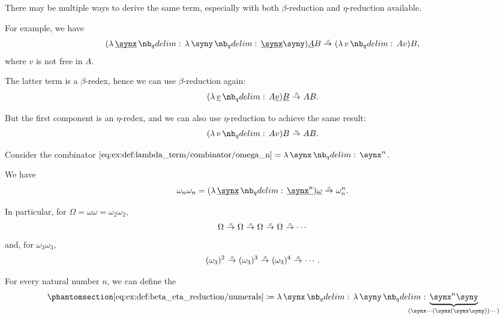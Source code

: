 \begin{example}
\begin{thmenum}
     There may be multiple ways to derive the same term, especially with both \( \beta \)-reduction and \( \eta \)-reduction available.

    For example, we have
    \begin{equation*}
      (\qabs {\hi{\synx}} \qabs \syny \hi{\synx} \syny) \hi{A} B \bred (\qabs v A v) B,
    \end{equation*}
    where \( v \) is not free in \( A \).

    The latter term is a \( \beta \)-redex, hence we can use \( \beta \)-reduction again:
    \begin{equation*}
      (\qabs {\hi{v}} A \hi{v}) \hi{B} \bred AB.
    \end{equation*}

    But the first component is an \( \eta \)-redex, and we can also use \( \eta \)-reduction to achieve the same result:
    \begin{equation*}
      (\qabs v A v) B \ered AB.
    \end{equation*}

     Consider the combinator \( \ref{eq:ex:def:lambda_term/combinator/omega_n} = \qabs \synx \synx^n \).

    We have
    \begin{equation*}
      \omega_n \omega_n
      =
      (\qabs {\hi{\synx}} \hi{\synx^n}) \hi{\omega}
      \bred
      \omega_n^n.
    \end{equation*}

    In particular, for \( \Omega = \omega \omega = \omega_2 \omega_2 \),
    \begin{equation*}
      \Omega \bred \Omega \bred \Omega \bred \Omega \bred \cdots
    \end{equation*}
    and, for \( \omega_3 \omega_3 \),
    \begin{equation*}
      (\omega_3)^2 \bred (\omega_3)^3 \bred (\omega_3)^4 \bred \cdots.
    \end{equation*}

     For every natural number \( n \), we can define the 
    \begin{equation*}\taglabel[\ensuremath{ C_n }]{eq:ex:def:beta_eta_reduction/numerals}
      \ref{eq:ex:def:beta_eta_reduction/numerals} \coloneqq \qabs \synx \qabs \syny \underbrace{\synx^n \syny}_{\mathclap{(\synx \cdots (\synx (\synx \syny)) \cdots)}}
    \end{equation*}


\end{thmenum}
\end{example}
